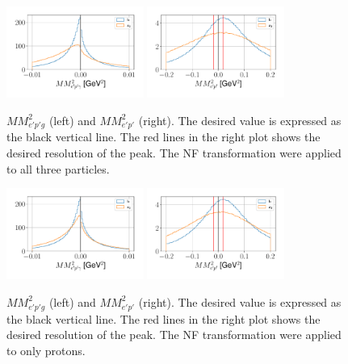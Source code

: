 \begin{figure}[htb]
    \centering
    \includegraphics[width=0.4\textwidth]{Chapters/Ch3-Simulations/normalizing_flows/pics/MeetingFigures/Sangbaek/MM2_epg.pdf}
    \includegraphics[width=0.4\textwidth]{Chapters/Ch3-Simulations/normalizing_flows/pics/MeetingFigures/Sangbaek/MM2_ep.pdf}
    \caption[Placeholder Short text]{$MM_{e'p'g}^2$ (left) and $MM_{e'p'}^2$ (right). The desired value is expressed as the black vertical line. The red lines in the right plot shows the desired resolution of the peak. The NF transformation were applied to all three particles.}
    \label{fig:allparticleNF}
\end{figure}

\begin{figure}[htb]
    \centering
    \includegraphics[width=0.4\textwidth]{Chapters/Ch3-Simulations/normalizing_flows/pics/MeetingFigures/Sangbaek/MM2_epg_proton.pdf}
    \includegraphics[width=0.4\textwidth]{Chapters/Ch3-Simulations/normalizing_flows/pics/MeetingFigures/Sangbaek/MM2_ep_proton.pdf}
    \caption[Placeholder Short text]{$MM_{e'p'g}^2$ (left) and $MM_{e'p'}^2$ (right). The desired value is expressed as the black vertical line. The red lines in the right plot shows the desired resolution of the peak. The NF transformation were applied to only protons.}
    \label{fig:protonNF}
\end{figure}
\clearpage

